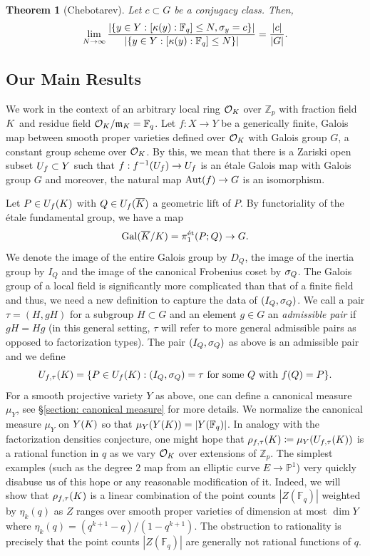 \documentclass[10pt]{article}
\theoremstyle{plain}
\newtheorem{thm}[theorem]{Theorem}
\theoremstyle{definition}
\numberwithin{equation}{section}
\begin{document}
\begin{thm}[Chebotarev]
Let $c \subset G$ be a conjugacy class. Then,
\[\lim_{N \to \infty}\frac{|\{y \in Y : [\kappa(y):\mathbb F_q] \leq N, \sigma_y = c\}|}{|\{y \in Y : [\kappa(y):\mathbb F_q] \leq N\}|} = \frac{|c|}{|G|}.\]
\end{thm}


\subsection{Our Main Results}

We work in the context of an arbitrary local ring ${{\mathcal O}_{K}}$ over $\mathbb Z_p$ with fraction field $K$ and residue field ${{\mathcal O}_{K}}/\mathfrak m_{K} = \mathbb F_q$. Let $f: X \to Y$ be a generically finite, Galois map between smooth proper varieties defined over ${{\mathcal O}_{K}}$ with Galois group $G$, a constant group scheme over ${{\mathcal O}_{K}}$. By this, we mean that there is a Zariski open subset $U_f \subset Y$ such that $f: f^{-1}(U_f) \to U_f$ is an \'etale Galois map with Galois group $G$ and moreover, the natural map $\operatorname{Aut}(f) \to G$ is an isomorphism. 

Let $P \in U_f(K)$ with $Q \in U_f(\overline{K})$ a geometric lift of $P$. By functoriality of the \'etale fundamental group, we have a map
\[\operatorname{Gal}(\overline{K}/K) = \pi_1^{\text{\'et}}(P;Q) \to G.\]
We denote the image of the entire Galois group by $D_Q$, the image of the inertia group by $I_Q$ and the image of the canonical Frobenius coset by $\sigma_Q$. The Galois group of a local field is significantly more complicated than that of a finite field and thus, we need a new definition to capture the data of $(I_Q,\sigma_Q)$. We call a pair $\tau = (H,gH)$ for a subgroup $H \subset G$ and an element $ g \in G$ an \emph{admissible pair} if $gH = Hg$ (in this general setting, $\tau$ will refer to more general admissible pairs as opposed to factorization types). The pair $(I_Q,\sigma_Q)$ as above is an admissible pair and we define 
\[U_{f,\tau}(K) = \{P \in U_f(K) : (I_Q,\sigma_Q) = \tau \text{ for some } Q \text{ with } f(Q) = P \}.\]
For a smooth projective variety $Y$ as above, one can define a canonical measure $\mu_Y$, see \S\ref{section: canonical measure} for more details. We normalize the canonical measure $\mu_Y$ on $Y(K)$ so that $\mu_Y(Y(K)) = |Y(\mathbb F_q)|$. In analogy with the factorization densities conjecture, one might hope that $\rho_{f,\tau}(K) \coloneqq \mu_Y(U_{f,\tau}(K))$ is a rational function in $q$ as we vary ${{\mathcal O}_{K}}$ over extensions of $\mathbb Z_p$. The simplest examples (such as the degree $2$ map from an elliptic curve $E \to \mathbb P^1$) very quickly disabuse us of this hope or any reasonable modification of it. Indeed, we will show that $\rho_{f,\tau}(K)$ is a linear combination of the point counts $|Z(\mathbb F_q)|$ weighted by $\eta_k(q)$ as $Z$ ranges over smooth proper varieties of dimension at most $\dim Y$ where $\eta_k(q) = (q^{k+1}-q)/(1-q^{k+1})$. The obstruction to rationality is precisely that the point counts $|Z(\mathbb F_q)|$ are generally not rational functions of $q$.
\end{document}
